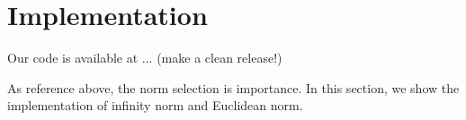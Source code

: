 \documentclass[10pt, conference, compsocconf]{IEEEtran}
\begin{document}
\section{Implementation}
Our code is available at ... (make a clean release!)

As reference above, the norm selection is importance. In this section,
we show the implementation of infinity norm and Euclidean norm.

\end{document}
